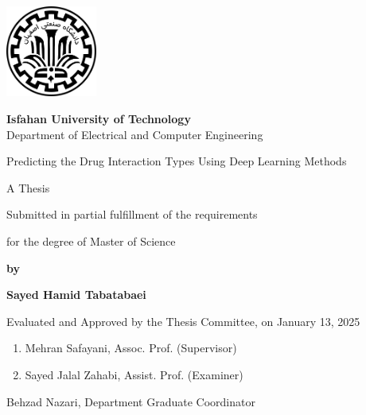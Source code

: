\thispagestyle{empty}
\begin{latin}
\begin{center}
\includegraphics[height=3cm]{iut_logo.png}
\vspace{0.4cm}

{\large\textbf{Isfahan University of Technology}}\\

\vspace{0.4cm}
Department of Electrical and Computer Engineering

\vspace{2.5cm}

{\Huge Predicting the Drug Interaction Types Using Deep Learning Methods}

\vspace{1.5cm}

{\large
	A Thesis
	
	\vspace{.3cm}
	
	Submitted in partial fulfillment of the requirements
	
	\vspace{.3cm}
	
	for the degree of Master of Science
}

	\vspace{1.5cm}

{\Large
	\textbf{by}
	
	\vspace{.3cm}
	
	\textbf{Sayed Hamid Tabatabaei}
}
\end{center}

\vfill

Evaluated and Approved by the Thesis Committee, on January 13, 2025
\vspace{0.5cm}

\begin{enumerate}
\item Mehran Safayani, Assoc. Prof. (Supervisor)
\item Sayed Jalal Zahabi, Assist. Prof. (Examiner)
\vspace{0.5cm}




\end{enumerate}

Behzad Nazari, Department Graduate Coordinator

\pagebreak
\end{latin}

\thispagestyle{empty}
\mbox{}

